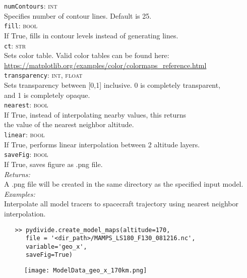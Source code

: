 \documentclass{article}
\begin{document}
\indent \texttt{numContours}: \textsc{int}\\
\indent \indent Specifies number of contour lines. Default is 25.\\
\indent \texttt{fill}: \textsc{bool}\\
\indent \indent If True, fills in contour levels instead of generating lines.\\
\indent \texttt{ct}: \textsc{str}\\
\indent \indent Sets color table. Valid color tables can be found here:\\
\indent \indent \href{https://matplotlib.org/examples/color/colormaps_reference.html}{https://matplotlib.org/examples/color/colormaps\_reference.html}\\
\indent \texttt{transparency}: \textsc{int, float}\\
\indent \indent Sets transparency between [0,1] inclusive. 0 is completely transparent,\\
\indent \indent and 1 is completely opaque.\\
\indent \texttt{nearest}: \textsc{bool}\\
\indent \indent If True, instead of interpolating nearby values, this returns\\
\indent \indent the value of the nearest neighbor altitude.\\
\indent \texttt{linear}: \textsc{bool}\\
\indent \indent If True, performs linear interpolation between 2 altitude layers.\\
\indent \texttt{saveFig}: \textsc{bool}\\
\indent \indent If True, saves figure as .png file.\\
\textit{Returns:}\\
\indent A .png file will be created in the same directory as the specified input model.\\
\noindent \textit{Examples:}\\
\indent Interpolate all model tracers to spacecraft trajectory using nearest neighbor\\
\indent interpolation.\\
\vspace{-10mm}
\begin{verbatim}
   >> pydivide.create_model_maps(altitude=170, 
      file = '<dir_path>/MAMPS_LS180_F130_081216.nc',
      variable='geo_x',
      saveFig=True)
\end{verbatim}
\begin{figure}[H]
\centering
\texttt{[image: ModelData\_geo\_x\_170km.png]}
\end{figure}
\end{document}
